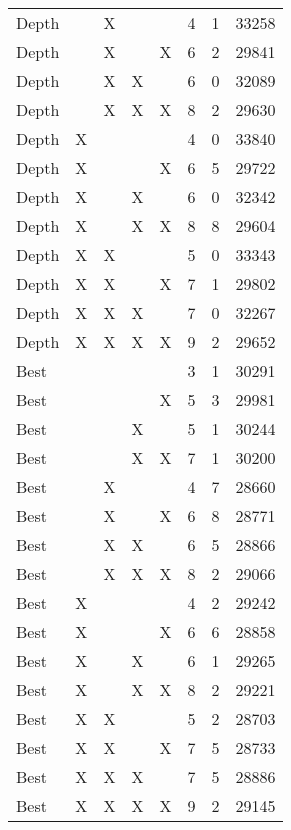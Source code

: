 \begin{tabular}{lllllrrr}
      Depth &    &  X &    &    &        4 &       1 &      33258 \\
      Depth &    &  X &    &  X &        6 &       2 &      29841 \\
      Depth &    &  X &  X &    &        6 &       0 &      32089 \\
      Depth &    &  X &  X &  X &        8 &       2 &      29630 \\
      Depth &  X &    &    &    &        4 &       0 &      33840 \\
      Depth &  X &    &    &  X &        6 &       5 &      29722 \\
      Depth &  X &    &  X &    &        6 &       0 &      32342 \\
      Depth &  X &    &  X &  X &        8 &       8 &      29604 \\
      Depth &  X &  X &    &    &        5 &       0 &      33343 \\
      Depth &  X &  X &    &  X &        7 &       1 &      29802 \\
      Depth &  X &  X &  X &    &        7 &       0 &      32267 \\
      Depth &  X &  X &  X &  X &        9 &       2 &      29652 \\
       Best &    &    &    &    &        3 &       1 &      30291 \\
       Best &    &    &    &  X &        5 &       3 &      29981 \\
       Best &    &    &  X &    &        5 &       1 &      30244 \\
       Best &    &    &  X &  X &        7 &       1 &      30200 \\
       Best &    &  X &    &    &        4 &       7 &      28660 \\
       Best &    &  X &    &  X &        6 &       8 &      28771 \\
       Best &    &  X &  X &    &        6 &       5 &      28866 \\
       Best &    &  X &  X &  X &        8 &       2 &      29066 \\
       Best &  X &    &    &    &        4 &       2 &      29242 \\
       Best &  X &    &    &  X &        6 &       6 &      28858 \\
       Best &  X &    &  X &    &        6 &       1 &      29265 \\
       Best &  X &    &  X &  X &        8 &       2 &      29221 \\
       Best &  X &  X &    &    &        5 &       2 &      28703 \\
       Best &  X &  X &    &  X &        7 &       5 &      28733 \\
       Best &  X &  X &  X &    &        7 &       5 &      28886 \\
       Best &  X &  X &  X &  X &        9 &       2 &      29145 \\
\bottomrule
\end{tabular}
\unskip
